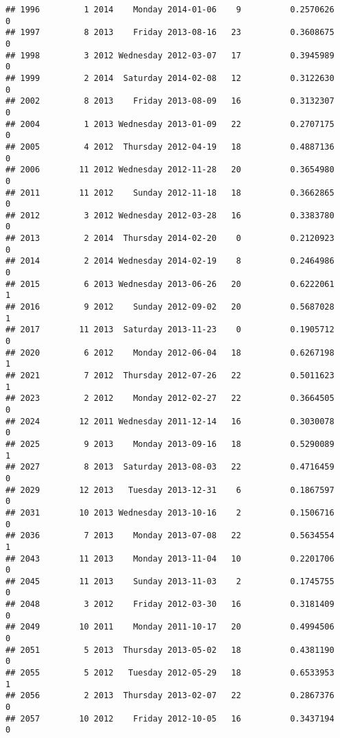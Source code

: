 \documentclass[
]{article}
\begin{document}
\begin{verbatim}
## 1996         1 2014    Monday 2014-01-06    9          0.2570626             0
## 1997         8 2013    Friday 2013-08-16   23          0.3608675             0
## 1998         3 2012 Wednesday 2012-03-07   17          0.3945989             0
## 1999         2 2014  Saturday 2014-02-08   12          0.3122630             0
## 2002         8 2013    Friday 2013-08-09   16          0.3132307             0
## 2004         1 2013 Wednesday 2013-01-09   22          0.2707175             0
## 2005         4 2012  Thursday 2012-04-19   18          0.4887136             0
## 2006        11 2012 Wednesday 2012-11-28   20          0.3654980             0
## 2011        11 2012    Sunday 2012-11-18   18          0.3662865             0
## 2012         3 2012 Wednesday 2012-03-28   16          0.3383780             0
## 2013         2 2014  Thursday 2014-02-20    0          0.2120923             0
## 2014         2 2014 Wednesday 2014-02-19    8          0.2464986             0
## 2015         6 2013 Wednesday 2013-06-26   20          0.6222061             1
## 2016         9 2012    Sunday 2012-09-02   20          0.5687028             1
## 2017        11 2013  Saturday 2013-11-23    0          0.1905712             0
## 2020         6 2012    Monday 2012-06-04   18          0.6267198             1
## 2021         7 2012  Thursday 2012-07-26   22          0.5011623             1
## 2023         2 2012    Monday 2012-02-27   22          0.3664505             0
## 2024        12 2011 Wednesday 2011-12-14   16          0.3030078             0
## 2025         9 2013    Monday 2013-09-16   18          0.5290089             1
## 2027         8 2013  Saturday 2013-08-03   22          0.4716459             0
## 2029        12 2013   Tuesday 2013-12-31    6          0.1867597             0
## 2031        10 2013 Wednesday 2013-10-16    2          0.1506716             0
## 2036         7 2013    Monday 2013-07-08   22          0.5634554             1
## 2043        11 2013    Monday 2013-11-04   10          0.2201706             0
## 2045        11 2013    Sunday 2013-11-03    2          0.1745755             0
## 2048         3 2012    Friday 2012-03-30   16          0.3181409             0
## 2049        10 2011    Monday 2011-10-17   20          0.4994506             0
## 2051         5 2013  Thursday 2013-05-02   18          0.4381190             0
## 2055         5 2012   Tuesday 2012-05-29   18          0.6533953             1
## 2056         2 2013  Thursday 2013-02-07   22          0.2867376             0
## 2057        10 2012    Friday 2012-10-05   16          0.3437194             0

\end{verbatim}
\end{document}

